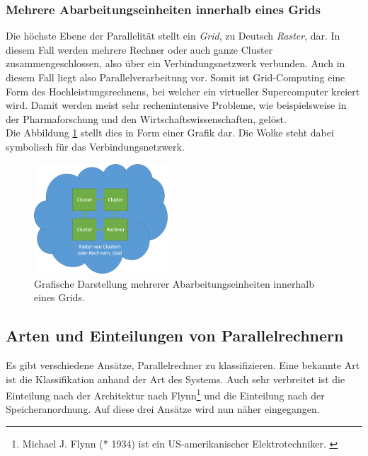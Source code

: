 			\subsubsection{Mehrere Abarbeitungseinheiten innerhalb eines Grids}
				\label{MehrereAbarbeitungseinheitenGrid}
			
				Die höchste Ebene der Parallelität stellt ein \textit{Grid}, zu Deutsch \textit{Raster}, dar. In diesem Fall werden mehrere Rechner oder auch ganze Cluster zusammengeschlossen, also über ein Verbindungsnetzwerk verbunden. Auch in diesem Fall liegt also Parallelverarbeitung vor. Somit ist Grid-Computing eine Form des Hochleistungsrechnens, bei welcher ein virtueller Supercomputer kreiert wird. Damit werden meist sehr rechenintensive Probleme, wie beispielsweise in der Pharmaforschung und den Wirtschaftswissenschaften, gelöst. \cite{GridWikipedia}\\
				Die Abbildung \ref{fig:EbenenDerParallelitaetGrid} stellt dies in Form einer Grafik dar. Die Wolke steht dabei symbolisch für das Verbindungsnetzwerk. \cite{GrundlagenParallelisierungKegel}
				
				\begin{figure}
					\centering	
					\includegraphics[width=5cm]{Abbildungen/Ebenen_der_Parallelitaet_Grid.png}
					\caption{Grafische Darstellung mehrerer Abarbeitungseinheiten innerhalb eines Grids.}
					\label{fig:EbenenDerParallelitaetGrid}
				\end{figure}
			
		\subsection{Arten und Einteilungen von Parallelrechnern}
		
			Es gibt verschiedene Ansätze, Parallelrechner zu klassifizieren. Eine bekannte Art ist die Klassifikation anhand der Art des Systems. Auch sehr verbreitet ist die Einteilung nach der Architektur nach Flynn\footnote{Michael J. Flynn (* 1934) ist ein US-amerikanischer Elektrotechniker. \cite{FlynnWikipedia}} und die Einteilung nach der Speicheranordnung. Auf diese drei Ansätze wird nun näher eingegangen.
			
